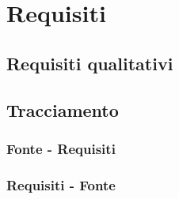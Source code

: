 \section{Requisiti}


\subsection{Requisiti qualitativi}


\subsection{Tracciamento}

\subsubsection{Fonte - Requisiti}
\subsubsection{Requisiti - Fonte}
